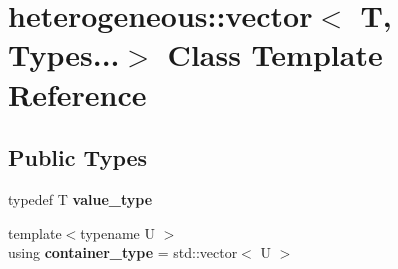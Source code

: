 \hypertarget{classheterogeneous_1_1vector_3_01_t_00_01_types_8_8_8_4}{}\section{heterogeneous\+:\+:vector$<$ T, Types...$>$ Class Template Reference}
\label{classheterogeneous_1_1vector_3_01_t_00_01_types_8_8_8_4}
\subsection*{Public Types}
\begin{DoxyCompactItemize}
\item 
\hypertarget{classheterogeneous_1_1vector_3_01_t_00_01_types_8_8_8_4_a9b5ab39bf74633619b6399fb8b37e2df}{}typedef T {\bfseries value\+\_\+type}\label{classheterogeneous_1_1vector_3_01_t_00_01_types_8_8_8_4_a9b5ab39bf74633619b6399fb8b37e2df}

\item 
\hypertarget{classheterogeneous_1_1vector_3_01_t_00_01_types_8_8_8_4_a3650be53cd220d8cd0365671ec6646c3}{}{\footnotesize template$<$typename U $>$ }\\using {\bfseries container\+\_\+type} = std\+::vector$<$ U $>$\label{classheterogeneous_1_1vector_3_01_t_00_01_types_8_8_8_4_a3650be53cd220d8cd0365671ec6646c3}

\end{DoxyCompactItemize}

